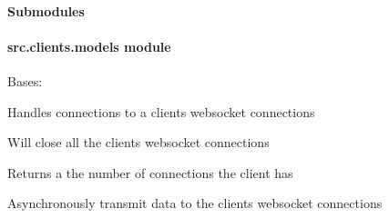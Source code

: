 \documentclass[letterpaper,10pt,english]{sphinxmanual}
\begin{document}
\paragraph{Submodules}
\label{\detokenize{src.clients:submodules}}

\paragraph{src.clients.models module}
\label{\detokenize{src.clients:module-src.clients.models}}\label{\detokenize{src.clients:src-clients-models-module}}

\begin{fulllineitems}
\label{\detokenize{src.clients:src.clients.models.Client}}
Bases: 

Handles connections to a clients websocket connections

\begin{fulllineitems}
\label{\detokenize{src.clients:src.clients.models.Client.close}}
Will close all the clients websocket connections

\end{fulllineitems}


\begin{fulllineitems}
\label{\detokenize{src.clients:src.clients.models.Client.dict_repr}}
Returns a the number of connections the client has

\end{fulllineitems}


\begin{fulllineitems}
\label{\detokenize{src.clients:src.clients.models.Client.receive}}
Asynchronously transmit data to the clients websocket connections


\end{fulllineitems}
\end{fulllineitems}
\end{document}
